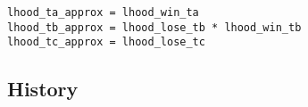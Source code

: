 \documentclass[article]{jss}
\newif\ifen
\newif\ifes
\newcommand{\en}[1]{\ifen#1\fi}
\newcommand{\es}[1]{\ifes#1\fi}
\begin{document}
%
\en{These are the messages sent by the factors $f_{d_1}$ and $f_{d_2}$ to the variables $t_a$ and $t_c$ respectively.}
\es{Estos son los mensajes que envían el factor $f_{d_1}$ y $f_{d_2}$ a la variable $t_a$ y $t_c$ respectivamente.}
%
\en{Finally, we compute the likelihood of each team.}
\es{Finalmente computar los likelihood de cada equipo.}
%
\begin{lstlisting}[backgroundcolor=\color{all},belowskip=0.1cm]
lhood_ta_approx = lhood_win_ta 
lhood_tb_approx = lhood_lose_tb * lhood_win_tb
lhood_tc_approx = lhood_lose_tc
\end{lstlisting}

\subsection{History} \label{sec:throguthTime}
\end{document}

